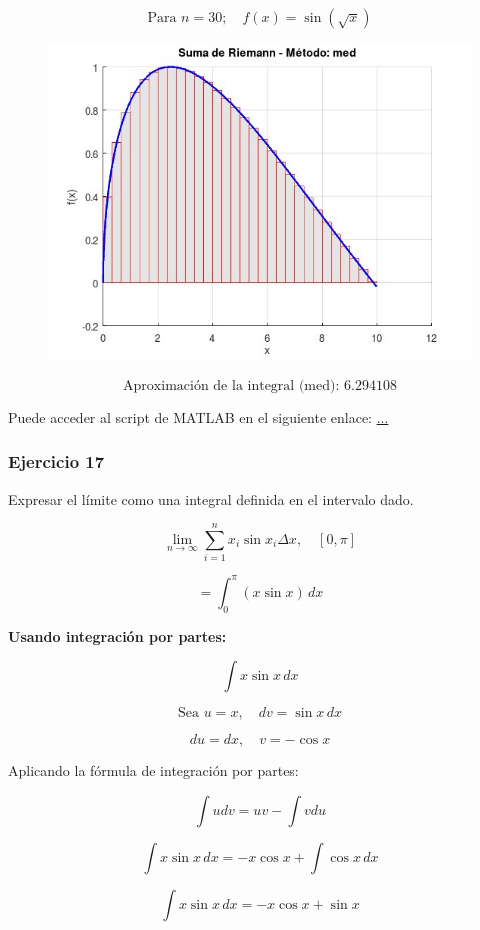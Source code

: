 \[
\text{Para } n = 30; \quad f(x) = \sin(\sqrt{x})
\]

\begin{figure}[H]
    \centering
    \includegraphics[scale=0.5]{images/3 n30.jpeg}
    \label{fig:riemann_med_n30}
\end{figure}

\[
\text{Aproximación de la integral (med): } 6.294108
\]

Puede acceder al script de MATLAB en el siguiente enlace: \url{...}

\subsubsection*{Ejercicio 17}

Expresar el límite como una integral definida en el intervalo dado.


\[
\lim_{n \to \infty} \sum_{i=1}^{n} x_i \sin x_i \Delta x, \quad [0, \pi]
\]

\[
= \int_{0}^{\pi} (x \sin x) \,dx
\]

\textbf{Usando integración por partes:}

\[
\int x \sin x \,dx
\]

\[
\text{Sea } u = x, \quad dv = \sin x \,dx
\]

\[
du = dx, \quad v = -\cos x
\]

Aplicando la fórmula de integración por partes:

\[
\int u dv = uv - \int v du
\]

\[
\int x \sin x \,dx = -x \cos x + \int \cos x \,dx
\]

\[
\int x \sin x \,dx = -x \cos x + \sin x
\]

